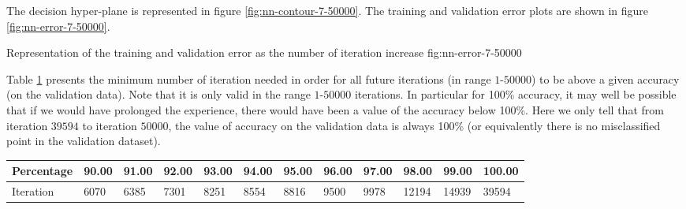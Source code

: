 \documentclass{article}
\begin{document}


The decision hyper-plane is represented in figure
\ref{fig:nn-contour-7-50000}.
The training and validation error plots are shown in figure
\ref{fig:nn-error-7-50000}.



{}
{Representation of the training and validation error as the number of iteration increase}
{fig:nn-error-7-50000}

Table \ref{tab:validation-iteration-required} presents the minimum
number of iteration needed in order for all future iterations (in
range $1$-$50000$) to be above a given accuracy (on the validation
data).
Note that it is only valid in the range $1$-$50000$ iterations.  In
particular for 100\% accuracy, it may well be possible that if we
would have prolonged the experience, there would have been a value of
the accuracy below 100\%. Here we only tell that from iteration $39594$ to
iteration $50000$, the value of accuracy on the validation data is
always 100\% (or equivalently there is no misclassified point in the
validation dataset).

\begin{table}[h!]
  \centering
  \begin{tabular}{|l|l|l|l|l|l|l|l|l|l|l|l|}
    \hline
    Percentage & 90.00 & 91.00 & 92.00 & 93.00 & 94.00 & 95.00 & 96.00 & 97.00 & 98.00 & 99.00 & 100.00 \\
    \hline
    Iteration & 6070 & 6385 & 7301 & 8251 & 8554 & 8816 & 9500 & 9978 & 12194 & 14939 & 39594 \\
    \hline
  \end{tabular}
   \label{tab:validation-iteration-required}
\end{table}
\end{document}

